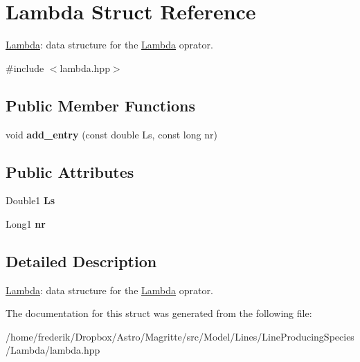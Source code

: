 \hypertarget{structLambda}{}\section{Lambda Struct Reference}
\label{structLambda}


\mbox{\hyperlink{structLambda}{Lambda}}\+: data structure for the \mbox{\hyperlink{structLambda}{Lambda}} oprator.  




{\ttfamily \#include $<$lambda.\+hpp$>$}

\subsection*{Public Member Functions}
\begin{DoxyCompactItemize}
\item 
\mbox{\label{structLambda_a501c4088dfc430615ccb7aa7f55de187}} 
void {\bfseries add\+\_\+entry} (const double Ls, const long nr)
\end{DoxyCompactItemize}
\subsection*{Public Attributes}
\begin{DoxyCompactItemize}
\item 
\mbox{\label{structLambda_a037c9579f00f5477ed1c73cd3866a11c}} 
Double1 {\bfseries Ls}
\item 
\mbox{\label{structLambda_a635eaeecc104cb55a907a75c4edad89a}} 
Long1 {\bfseries nr}
\end{DoxyCompactItemize}


\subsection{Detailed Description}
\mbox{\hyperlink{structLambda}{Lambda}}\+: data structure for the \mbox{\hyperlink{structLambda}{Lambda}} oprator. 

The documentation for this struct was generated from the following file\+:\begin{DoxyCompactItemize}
\item 
/home/frederik/\+Dropbox/\+Astro/\+Magritte/src/\+Model/\+Lines/\+Line\+Producing\+Species/\+Lambda/lambda.\+hpp\end{DoxyCompactItemize}
